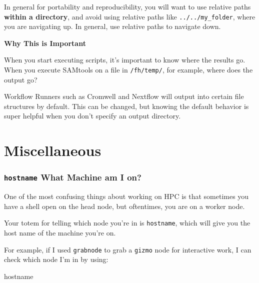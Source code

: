 \documentclass[
  letterpaper,
  DIV=11,
  numbers=noendperiod]{scrreprt}
\newenvironment{Shaded}{\begin{snugshade}}{\end{snugshade}}
\newcommand{\FunctionTok}[1]{\textcolor[rgb]{0.28,0.35,0.67}{#1}}
\begin{document}
In general for portability and reproducibility, you will want to use
relative paths \textbf{within a directory}, and avoid using relative
paths like \texttt{../../my\_folder}, where you are navigating up. In
general, use relative paths to navigate down.

\begin{tcolorbox}[enhanced jigsaw, breakable, leftrule=.75mm, colframe=quarto-callout-color-frame, left=2mm, toprule=.15mm, arc=.35mm, rightrule=.15mm, opacityback=0, bottomrule=.15mm, colback=white]

\vspace{-3mm}\textbf{Why This is Important}\vspace{3mm}

When you start executing scripts, it's important to know where the
results go. When you execute SAMtools on a file in \texttt{/fh/temp/},
for example, where does the output go?

Workflow Runners such as Cromwell and Nextflow will output into certain
file structures by default. This can be changed, but knowing the default
behavior is super helpful when you don't specify an output directory.

\end{tcolorbox}


\chapter{Miscellaneous}\label{miscellaneous}

\subsection{\texorpdfstring{\texttt{hostname} What Machine am I
on?}{hostname What Machine am I on?}}\label{hostname-what-machine-am-i-on}

One of the most confusing things about working on HPC is that sometimes
you have a shell open on the head node, but oftentimes, you are on a
worker node.

Your totem for telling which node you're in is \texttt{hostname}, which
will give you the host name of the machine you're on.

For example, if I used \texttt{grabnode} to grab a \texttt{gizmo} node
for interactive work, I can check which node I'm in by using:

\begin{Shaded}
\begin{Highlighting}[]
\FunctionTok{hostname}
\end{Highlighting}
\end{Shaded}
\end{document}
